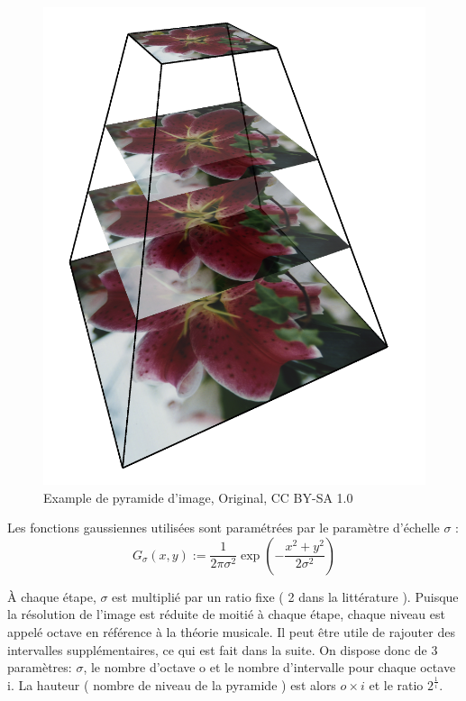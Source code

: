 \documentclass{article}
\begin{document}
	\begin{figure}
		\centering
		\includegraphics[scale=0.1]{img.png}
		\caption{Example de pyramide d'image, Original, CC BY-SA 1.0}
		\label{fig:ex}
	\end{figure}	 

	Les fonctions gaussiennes utilisées sont paramétrées par le paramètre d'échelle $\sigma$ : \[G_{\sigma}(x,y):=\frac{1}{2\pi\sigma^{2}}\exp(-\frac{x^{2}+y^{2}}{2\sigma^{2}})\]

	\`{A} chaque étape, $\sigma$ est multiplié par un ratio fixe ( 2 dans la littérature ). Puisque la résolution de l'image est réduite de moitié à chaque étape, chaque niveau est appelé octave en référence à la théorie musicale. Il peut être utile de rajouter des intervalles supplémentaires, ce qui est fait dans la suite. 
	On dispose donc de 3 paramètres: $\sigma$, le nombre d'octave o et le nombre d'intervalle pour chaque octave i. La hauteur ( nombre de niveau de la pyramide ) est alors $o \times i$ et le ratio $2^{\frac{1}{i}}$.\\
\end{document}
